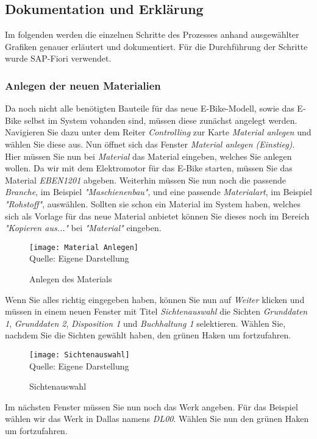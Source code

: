 \subsection{Dokumentation und Erklärung}
Im folgenden werden die einzelnen Schritte des Prozesses anhand ausgewählter Grafiken genauer erläutert und dokumentiert. Für die Durchführung der Schritte wurde SAP-Fiori verwendet.
\subsubsection{Anlegen der neuen Materialien}
Da noch nicht alle benötigten Bauteile für das neue E-Bike-Modell, sowie das E-Bike selbst im System vohanden sind, müssen diese zunächst angelegt werden.
 Navigieren Sie dazu unter dem Reiter \textit{Controlling} zur Karte \textit{Material anlegen} und wählen Sie diese aus. Nun öffnet sich das Fenster 
 \textit{Material anlegen (Einstieg)}. Hier müssen Sie nun bei \textit{Material} das Material eingeben, welches Sie anlegen wollen. Da wir mit dem Elektromotor für das E-Bike starten,
 müssen Sie das Material \textit{EBEN1201} abgeben. Weiterhin müssen Sie nun noch die passende
 \textit{Branche}, im Beispiel \textit{"Maschienenbau"}, und eine passende \textit{Materialart}, im Beispiel \textit{"Rohstoff"}, auswählen. Sollten sie schon ein Material im System haben, 
 welches sich als Vorlage für das neue Material anbietet können Sie dieses noch im Bereich \textit{"Kopieren aus..."} bei \textit{"Material"} eingeben.
\begin{figure}[H]
    \caption{Anlegen des Materials}\label{fig:material}
    \texttt{[image: Material Anlegen]}
    \\
    Quelle: Eigene Darstellung
\end{figure}
Wenn Sie alles richtig eingegeben haben, können Sie nun auf \textit{Weiter} klicken und müssen in einem neuen Fenster mit Titel \textit{Sichtenauswahl} die Sichten
 \textit{Grunddaten 1}, \textit{Grunddaten 2}, \textit{Disposition 1} und \textit{Buchhaltung 1} selektieren. Wählen Sie, nachdem Sie die Sichten gewählt haben, den grünen Haken um fortzufahren.
\begin{figure}[H]
    \caption{Sichtenauswahl}\label{fig:sichtenauswahl}
    \texttt{[image: Sichtenauswahl]}
    \\
    Quelle: Eigene Darstellung
\end{figure}
Im nächsten Fenster müssen Sie nun noch das Werk angeben. Für das Beispiel wählen wir das Werk in Dallas namens \textit{DL00}. Wählen Sie nun den grünen Haken um fortzufahren.
